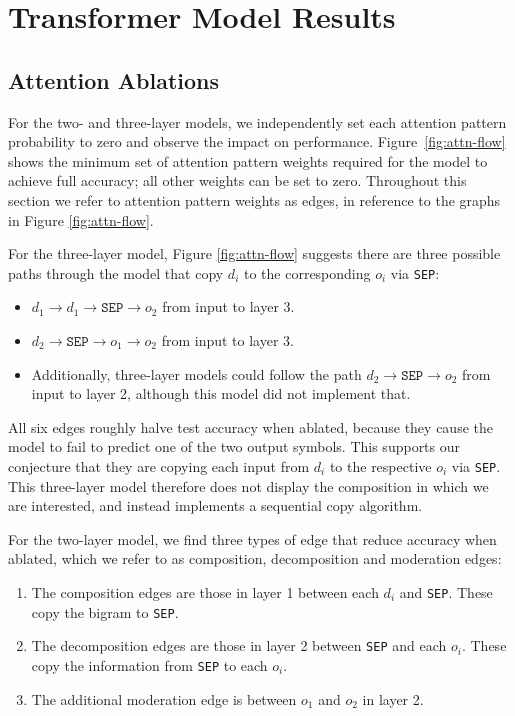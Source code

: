 \section{Transformer Model Results}\label{s:res_rq1}

\subsection{Attention Ablations}\label{ss:results-ablations}

For the two- and three-layer models, we independently set each attention pattern probability to zero and observe the impact on performance. Figure~\ref{fig:attn-flow} shows the minimum set of attention pattern weights required for the model to achieve full accuracy; all other weights can be set to zero. Throughout this section we refer to attention pattern weights as edges, in reference to the graphs in Figure \ref{fig:attn-flow}.

For the three-layer model, Figure \ref{fig:attn-flow} suggests there are three possible paths through the model that copy $d_i$ to the corresponding $o_i$ via \texttt{SEP}:
\begin{itemize}
    \item $d_1 \rightarrow d_1 \rightarrow \texttt{SEP} \rightarrow o_2$ from input to layer 3.
    \item $d_2 \rightarrow \texttt{SEP} \rightarrow o_1 \rightarrow o_2$ from input to layer 3.
    \item Additionally, three-layer models could follow the path $d_2 \rightarrow \texttt{SEP} \rightarrow o_2$ from input to layer 2, although this model did not implement that.
\end{itemize}

All six edges roughly halve test accuracy when ablated, because they cause the model to fail to predict one of the two output symbols.
This supports our conjecture that they are copying each input from $d_i$ to the respective $o_i$ via \texttt{SEP}. 
This three-layer model therefore does not display the composition in which we are interested, and instead implements a sequential copy algorithm.

For the two-layer model, we find three types of edge that reduce accuracy when ablated, which we refer to as composition, decomposition and moderation edges:
\begin{enumerate}
    \item The composition edges are those in layer 1 between each $d_i$ and \texttt{SEP}. These copy the bigram to \texttt{SEP}.
    \item  The decomposition edges are those in layer 2 between \texttt{SEP} and each $o_i$. These copy the information from \texttt{SEP} to each $o_i$. 
    \item The additional moderation edge is between $o_1$ and $o_2$ in layer 2.
\end{enumerate}

